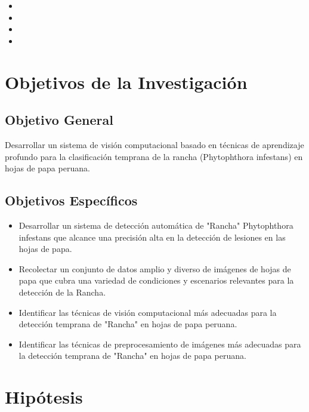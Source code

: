 \begin{itemize}
	\item \Pbone
	\item \Pbtwo
	\item \Pbthree
	\item \Pbfour
\end{itemize}

\section{Objetivos de la Investigación} 
\subsection{Objetivo General}
\newcommand{\ObjetivoGeneral}{
	Desarrollar un sistema de visión computacional basado en técnicas de aprendizaje profundo para la clasificación temprana de la rancha (Phytophthora infestans) en hojas de papa peruana.
}
\ObjetivoGeneral

\subsection{Objetivos Específicos}
\newcommand{\Objone}{
	Desarrollar un sistema de detección automática de "Rancha" Phytophthora infestans que alcance una precisión alta en la detección de lesiones en las hojas de papa.
}

\newcommand{\Objtwo}{
	Recolectar un conjunto de datos amplio y diverso de imágenes de hojas de papa que cubra una variedad de condiciones y escenarios relevantes para la detección de la Rancha.
}

\newcommand{\Objthree}{
Identificar las técnicas de visión computacional más adecuadas para la detección temprana de "Rancha" en hojas de papa peruana.
}

\newcommand{\Objfour}{
Identificar las técnicas de preprocesamiento de imágenes más adecuadas para la detección temprana de "Rancha" en hojas de papa peruana.
}


\begin{itemize}
	\item {\Objone}
	\item {\Objtwo}
	\item {\Objthree}
	\item {\Objfour}
\end{itemize}

\section{Hipótesis}

